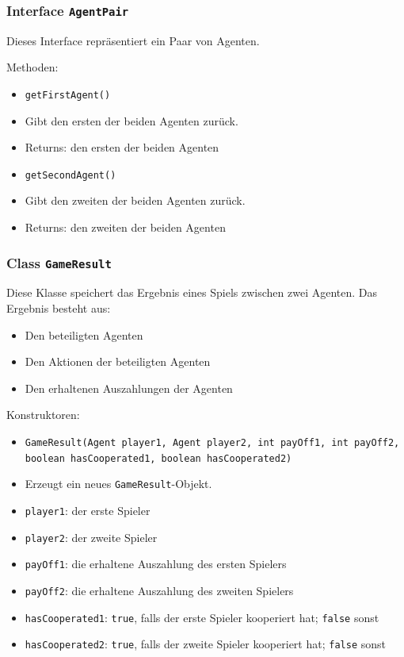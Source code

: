 \documentclass[parskip=full,11pt]{scrartcl}
\begin{document}
\subsubsection{Interface \texttt{AgentPair}}
Dieses Interface repräsentiert ein Paar von Agenten.

Methoden:
\begin{itemize}\itemsep -10pt
\item \texttt{getFirstAgent()}
\item[] Gibt den ersten der beiden Agenten zurück.
\item[] Returns: den ersten der beiden Agenten

\item \texttt{getSecondAgent()}
\item[] Gibt den zweiten der beiden Agenten zurück.
\item[] Returns: den zweiten der beiden Agenten
\end{itemize}

\subsubsection{Class \texttt{GameResult}}

Diese Klasse speichert das Ergebnis eines Spiels zwischen zwei Agenten. Das Ergebnis besteht aus:
\begin{itemize}\itemsep -10pt
	\item Den beteiligten Agenten
	\item Den Aktionen der beteiligten Agenten
	\item Den erhaltenen Auszahlungen der Agenten
\end{itemize}
	
Konstruktoren:
\begin{itemize}\itemsep -10pt
\item \texttt{GameResult(Agent player1, Agent player2, int payOff1, int payOff2, boolean hasCooperated1, boolean hasCooperated2)}
\item[] Erzeugt ein neues \texttt{GameResult}-Objekt.
\item[] \texttt{player1}: der erste Spieler
\item[] \texttt{player2}: der zweite Spieler
\item[] \texttt{payOff1}: die erhaltene Auszahlung des ersten Spielers
\item[] \texttt{payOff2}: die erhaltene Auszahlung des zweiten Spielers
\item[] \texttt{hasCooperated1}: \texttt{true}, falls der erste Spieler kooperiert hat; \texttt{false} sonst
\item[] \texttt{hasCooperated2}: \texttt{true}, falls der zweite Spieler kooperiert hat; \texttt{false} sonst
\end{itemize}
\end{document}

